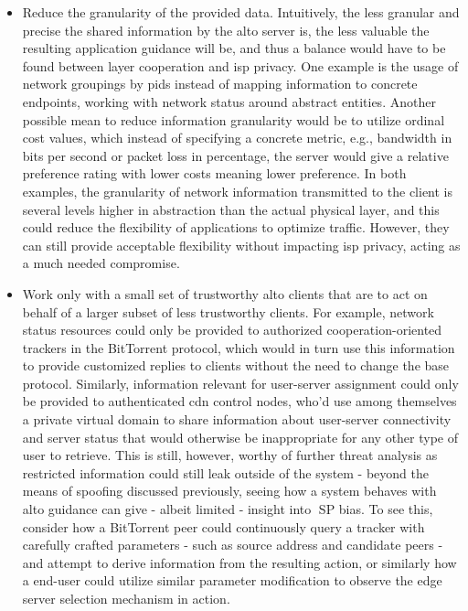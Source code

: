 \begin{itemize}
    \item Reduce the granularity of the provided data.
        Intuitively, the less granular and precise the shared information by the \gls{alto} server is, the less valuable the resulting application guidance will be, and thus a balance would have to be found between layer cooperation and \gls{isp} privacy.
        One example is the usage of network groupings by \glspl{pid} instead of mapping information to concrete endpoints, working with network status around abstract entities.
        Another possible mean to reduce information granularity would be to utilize ordinal cost values, which instead of specifying a concrete metric, e.g., bandwidth in bits per second or packet loss in percentage, the server would give a relative preference rating with lower costs meaning lower preference.
        In both examples, the granularity of network information transmitted to the client is several levels higher in abstraction than the actual physical layer, and this could reduce the flexibility of applications to optimize traffic.
        However, they can still provide acceptable flexibility without impacting \gls{isp} privacy, acting as a much needed compromise.

    \item Work only with a small set of trustworthy \gls{alto} clients that are to act on behalf of a larger subset of less trustworthy clients.
        For example, network status resources could only be provided to authorized cooperation-oriented trackers in the BitTorrent protocol, which would in turn use this information to provide customized replies to clients without the need to change the base protocol.
        Similarly, information relevant for user-server assignment could only be provided to authenticated \gls{cdn} control nodes, who'd use among themselves a private virtual domain to share information about user-server connectivity and server status that would otherwise be inappropriate for any other type of user to retrieve.
        This is still, however, worthy of further threat analysis as restricted information could still leak outside of the system - beyond the means of spoofing discussed previously, seeing how a system behaves with \gls{alto} guidance can give - albeit limited - insight into SP bias.
        To see this, consider how a BitTorrent peer could continuously query a tracker with carefully crafted parameters - such as source address and candidate peers - and attempt to derive information from the resulting action, or similarly how a end-user could utilize similar parameter modification to observe the edge server selection mechanism in action.


\end{itemize}
